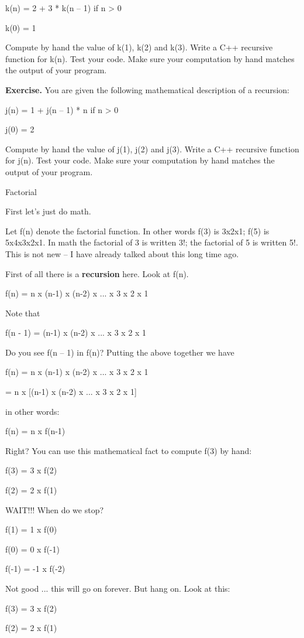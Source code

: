 \documentclass[
]{article}
\begin{document}
k(n) = 2 + 3 * k(n -- 1) if n \textgreater{} 0

k(0) = 1

Compute by hand the value of k(1), k(2) and k(3). Write a C++ recursive
function for k(n). Test your code. Make sure your computation by hand
matches the output of your program.

\textbf{Exercise.} You are given the following mathematical description
of a recursion:

j(n) = 1 + j(n -- 1) * n if n \textgreater{} 0

j(0) = 2

Compute by hand the value of j(1), j(2) and j(3). Write a C++ recursive
function for j(n). Test your code. Make sure your computation by hand
matches the output of your program.

Factorial

First let's just do math.

Let f(n) denote the factorial function. In other words f(3) is 3x2x1;
f(5) is 5x4x3x2x1. In math the factorial of 3 is written 3!; the
factorial of 5 is written 5!. This is not new -- I have already talked
about this long time ago.

First of all there is a \textbf{recursion} here. Look at f(n).

f(n) = n x (n-1) x (n-2) x ... x 3 x 2 x 1

Note that

f(n - 1) = (n-1) x (n-2) x ... x 3 x 2 x 1

Do you see f(n -- 1) in f(n)? Putting the above together we have

f(n) = n x (n-1) x (n-2) x ... x 3 x 2 x 1

= n x {[}(n-1) x (n-2) x ... x 3 x 2 x 1{]}

in other words:

f(n) = n x f(n-1)

Right? You can use this mathematical fact to compute f(3) by hand:

f(3) = 3 x f(2)

f(2) = 2 x f(1)

WAIT!!! When do we stop?

f(1) = 1 x f(0)

f(0) = 0 x f(-1)

f(-1) = -1 x f(-2)

Not good ... this will go on forever. But hang on. Look at this:

f(3) = 3 x f(2)

f(2) = 2 x f(1)
\end{document}
